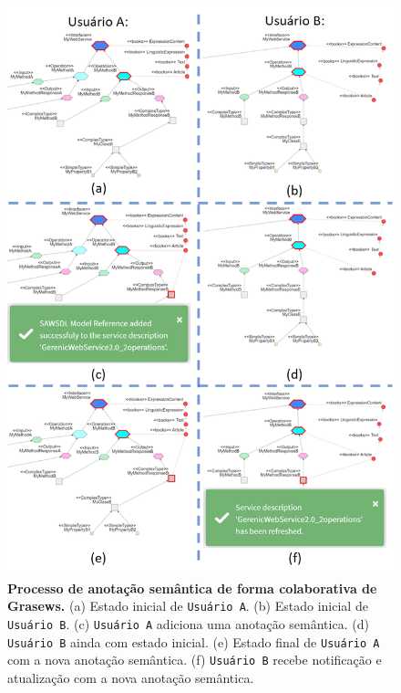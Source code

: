     \begin{figure}[h!]
            \includegraphics[scale=0.66]{4-grasews/imagens/grasews-anotacao-semantica-compartilhada.png}
        \centering
        \caption[Processo de anotação semântica de forma colaborativa de Grasews]{\textbf{Processo de anotação semântica de forma colaborativa de Grasews.} (a) Estado inicial de \texttt{Usuário A}. (b) Estado inicial de \texttt{Usuário B}. (c) \texttt{Usuário A} adiciona uma anotação semântica. (d) \texttt{Usuário B} ainda com estado inicial. (e) Estado final de \texttt{Usuário A} com a nova anotação semântica. (f) \texttt{Usuário B} recebe notificação e atualização com a nova anotação semântica.}
        \label{fig:grasews-anotacao-semantica-compartilhada}
    \end{figure}


